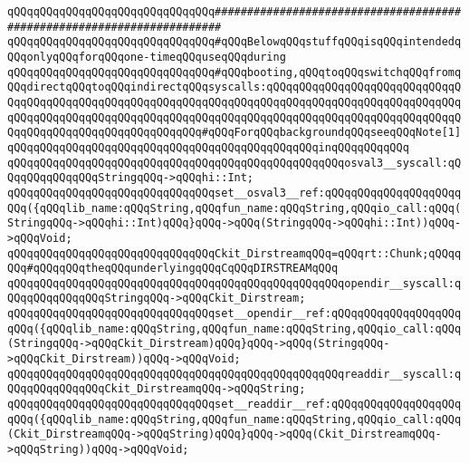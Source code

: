 \newline
\verb|qQQqqQQqqQQqqQQqqQQqqQQqqQQqqQQq#######################################################################|\newline
\verb|qQQqqQQqqQQqqQQqqQQqqQQqqQQqqQQq#qQQqBelowqQQqstuffqQQqisqQQqintendedqQQqonlyqQQqforqQQqone-timeqQQquseqQQqduring|\newline
\verb|qQQqqQQqqQQqqQQqqQQqqQQqqQQqqQQq#qQQqbooting,qQQqtoqQQqswitchqQQqfromqQQqdirectqQQqtoqQQqindirectqQQqsyscalls:qQQqqQQqqQQqqQQqqQQqqQQqqQQqqQQqqQQqqQQqqQQqqQQqqQQqqQQqqQQqqQQqqQQqqQQqqQQqqQQqqQQqqQQqqQQqqQQqqQQqqQQqqQQqqQQqqQQqqQQqqQQqqQQqqQQqqQQqqQQqqQQqqQQqqQQqqQQqqQQqqQQqqQQqqQQqqQQqqQQqqQQqqQQqqQQqqQQqqQQq#qQQqForqQQqbackgroundqQQqseeqQQqNote[1]qQQqqQQqqQQqqQQqqQQqqQQqqQQqqQQqqQQqqQQqqQQqqQQqinqQQqqQQqqQQq|\newline
\newline
\verb|qQQqqQQqqQQqqQQqqQQqqQQqqQQqqQQqqQQqqQQqqQQqqQQqqQQqosval3__syscall:qQQqqQQqqQQqqQQqStringqQQq->qQQqhi::Int;|\newline
\verb|qQQqqQQqqQQqqQQqqQQqqQQqqQQqqQQqset__osval3__ref:qQQqqQQqqQQqqQQqqQQqqQQq({qQQqlib_name:qQQqString,qQQqfun_name:qQQqString,qQQqio_call:qQQq(StringqQQq->qQQqhi::Int)qQQq}qQQq->qQQq(StringqQQq->qQQqhi::Int))qQQq->qQQqVoid;|\newline
\newline
\verb|qQQqqQQqqQQqqQQqqQQqqQQqqQQqqQQqCkit_DirstreamqQQq=qQQqrt::Chunk;qQQqqQQq#qQQqqQQqtheqQQqunderlyingqQQqCqQQqDIRSTREAMqQQq|\newline
\newline
\verb|qQQqqQQqqQQqqQQqqQQqqQQqqQQqqQQqqQQqqQQqqQQqqQQqqQQqopendir__syscall:qQQqqQQqqQQqqQQqStringqQQq->qQQqCkit_Dirstream;|\newline
\verb|qQQqqQQqqQQqqQQqqQQqqQQqqQQqqQQqset__opendir__ref:qQQqqQQqqQQqqQQqqQQqqQQq({qQQqlib_name:qQQqString,qQQqfun_name:qQQqString,qQQqio_call:qQQq(StringqQQq->qQQqCkit_Dirstream)qQQq}qQQq->qQQq(StringqQQq->qQQqCkit_Dirstream))qQQq->qQQqVoid;|\newline
\newline
\verb|qQQqqQQqqQQqqQQqqQQqqQQqqQQqqQQqqQQqqQQqqQQqqQQqqQQqreaddir__syscall:qQQqqQQqqQQqqQQqCkit_DirstreamqQQq->qQQqString;|\newline
\verb|qQQqqQQqqQQqqQQqqQQqqQQqqQQqqQQqset__readdir__ref:qQQqqQQqqQQqqQQqqQQqqQQq({qQQqlib_name:qQQqString,qQQqfun_name:qQQqString,qQQqio_call:qQQq(Ckit_DirstreamqQQq->qQQqString)qQQq}qQQq->qQQq(Ckit_DirstreamqQQq->qQQqString))qQQq->qQQqVoid;|\newline
